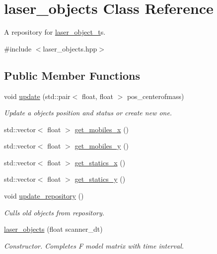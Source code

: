 \hypertarget{classlaser__objects}{}\section{laser\+\_\+objects Class Reference}
\label{classlaser__objects}


A repository for \hyperlink{classlaser__object__t}{laser\+\_\+object\+\_\+t}\textquotesingle{}s.  




{\ttfamily \#include $<$laser\+\_\+objects.\+hpp$>$}

\subsection*{Public Member Functions}
\begin{DoxyCompactItemize}
\item 
void \hyperlink{group__laser__objects_ga8e139bb70c4e8589e512a71f244b45ef}{update} (std\+::pair$<$ float, float $>$ pos\+\_\+centerofmass)
\begin{DoxyCompactList}\small\item\em Update a object\textquotesingle{}s position and status or create new one. \end{DoxyCompactList}\item 
std\+::vector$<$ float $>$ \hyperlink{group__laser__objects_ga5d288e741d7fca610899fd1b9f822826}{get\+\_\+mobiles\+\_\+x} ()
\item 
std\+::vector$<$ float $>$ \hyperlink{group__laser__objects_gab76cec03e47705fcad27a2cf9d9b62a0}{get\+\_\+mobiles\+\_\+y} ()
\item 
std\+::vector$<$ float $>$ \hyperlink{group__laser__objects_ga1f4e68699b3a5ea853dce7e45123a284}{get\+\_\+statics\+\_\+x} ()
\item 
std\+::vector$<$ float $>$ \hyperlink{group__laser__objects_ga6063594fe030d1d8c33e6f4d2e1b3ef0}{get\+\_\+statics\+\_\+y} ()
\item 
void \hyperlink{group__laser__objects_ga8491aebb670f24305deeb85a9da26ede}{update\+\_\+repository} ()
\begin{DoxyCompactList}\small\item\em Culls old objects from repository. \end{DoxyCompactList}\item 
\hyperlink{group__laser__objects_ga9be2a1b55a49c0083bc37ac770ca2fa7}{laser\+\_\+objects} (float scanner\+\_\+dt)
\begin{DoxyCompactList}\small\item\em Constructor. Completes F model matrix with time interval. \end{DoxyCompactList}\end{DoxyCompactItemize}


